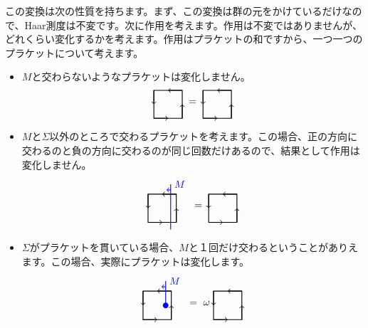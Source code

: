 \documentclass[generalized_symmetry.tex]{subfiles}
\begin{document}
この変換は次の性質を持ちます。まず、この変換は群の元をかけているだけなので、Haar測度は不変です。次に作用を考えます。作用は不変ではありませんが、どれくらい変化するかを考えます。作用はプラケットの和ですから、一つ一つのプラケットについて考えます。
\newcommand{\plaquette}{
  \draw[thick] (-1,-1) rectangle (1,1);
  \draw[->, thick] (-1,-1) -- (0,-1); %
  \draw[->, thick] (1,-1) -- (1,0);   %
  \draw[->, thick] (1,1) -- (0,1);  %
  \draw[->, thick] (-1,1) -- (-1,0);%
}
\begin{itemize}
    \item $M$と交わらないようなプラケットは変化しません。
    \begin{align}
        \begin{tikzpicture}[scale=0.5,baseline=0pt]
        \plaquette
        \end{tikzpicture}\ 
        =\ 
        \begin{tikzpicture}[scale=0.5,baseline=0pt]
        \plaquette
        \end{tikzpicture}
    \end{align}
    \item $M$と$\Sigma$以外のところで交わるプラケットを考えます。この場合、正の方向に交わるのと負の方向に交わるのが同じ回数だけあるので、結果として作用は変化しません。
    \begin{align}
        \begin{tikzpicture}[scale=0.5,baseline=0pt]
        \plaquette
        \draw[blue, thick] (0.6,-1.5) -- (0.6,1.7)node[above,right]{$M$};
        \draw[->, blue, thick] (0.6,1.3) -- (0.3,1.3);
        \end{tikzpicture}\ 
        =\ 
        \begin{tikzpicture}[scale=0.5,baseline=0pt]
        \plaquette
        \end{tikzpicture}
    \end{align}
    \item $\Sigma$がプラケットを貫いている場合、$M$と１回だけ交わるということがありえます。この場合、実際にプラケットは変化します。
    \begin{align}
        \begin{tikzpicture}[scale=0.5,baseline=0pt]
        \plaquette
        \draw[blue, thick] (0.6,0) node[fill=blue,circle,inner sep=2pt]{};
        \draw[blue, thick] (0.6,0) -- (0.6,1.7)node[above,right]{$M$};
        \draw[->, blue, thick] (0.6,1.3) -- (0.3,1.3);
        \end{tikzpicture}\ 
        =\ \omega\ 
        \begin{tikzpicture}[scale=0.5,baseline=0pt]
        \plaquette
        \end{tikzpicture}
    \end{align}
\end{itemize}
\end{document}
